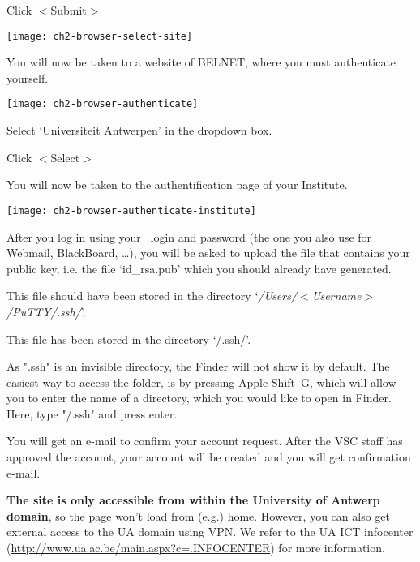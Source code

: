 Click $<$Submit$>$

\texttt{[image: ch2-browser-select-site]}

\ifantwerpen
  You will now be taken to a website of BELNET, where you must authenticate yourself.

  \texttt{[image: ch2-browser-authenticate]}

  Select `Universiteit Antwerpen' in the dropdown box.

  Click $<$Select$>$
\fi

You will now be taken to the authentification page of your Institute.

\ifantwerpen
\texttt{[image: ch2-browser-authenticate-institute]}
\fi

After you log in using your \university\ login and password (the one you also
use for Webmail, BlackBoard, \dots ), you will be asked to upload the file that
contains your public key, i.e. the file `id\_rsa.pub' which you should already
have generated.

\ifwindows

  This file should have been stored in the directory
  `\textit{/Users/$<$Username$>$/PuTTY/.ssh/}'.

\fi



\ifmac

  This file has been stored in the directory `\tilde/.ssh/'.

  \textbf{} As ".ssh" is an invisible directory, the Finder will
  not show it by default. The easiest way to access the folder, is by pressing
  Apple-Shift--G, which will allow you to enter the name of a directory, which
  you would like to open in Finder. Here, type "\tilde/.ssh" and press enter.

\fi

You will get an e-mail to confirm your account request. After the VSC staff has
approved the account, your account will be created and you will get
confirmation e-mail.

\ifantwerpen
\textbf{The site is only accessible from within the University of Antwerp
domain}, so the page won't load from (e.g.) home. However, you can also get
external access to the UA domain using VPN. We refer to the UA ICT infocenter
(\url{http://www.ua.ac.be/main.aspx?c=.INFOCENTER}) for more information.

